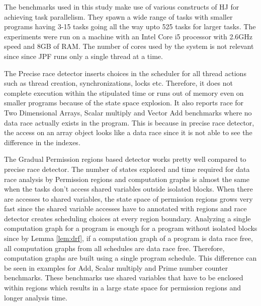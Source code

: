 The benchmarks used in this study make use of various constructs of HJ for achieving task parallelism. They spawn a wide range of tasks with smaller programs having 3-15 tasks going all the way upto 525 tasks for larger tasks. The experiments were run on a machine with an Intel Core i5 processor with 2.6GHz speed and 8GB of RAM. The number of cores used by the system is not relevant since since JPF runs only a single thread at a time.

The Precise race detector inserts choices in the scheduler for all thread actions such as thread creation, synchronizations, locks etc. Therefore, it does not complete execution within the stipulated time or runs out of memory even on smaller programs because of the state space explosion. It also reports race for Two Dimensional Arrays, Scalar multiply and Vector Add benchmarks where no data race actually exists in the program. This is because in precise race detector, the access on an array object looks like a data race since it is not able to see the difference in the indexes.

The Gradual Permission regions based detector works pretty well compared to precise race detector. The number of states explored and time required for data race analysis by Permission regions and computation graphs is almost the same when the tasks don't access shared variables outside isolated blocks. When there are accesses to shared variables, the state space of permission regions grows very fast since the shared variable accesses have to annotated with regions and race detector creates scheduling choices at every region boundary. Analyzing a single computation graph for a program is enough for a program without isolated blocks since by Lemma \ref{lem:drf}, if a computation graph of a program is data race free, all computation graphs from all schedules are data race free. Therefore, computation graphs are built using a single program schedule. This difference can be seen in examples for Add, Scalar multiply and Prime number counter benchmarks. These benchmarks use shared variables that have to be enclosed within regions which results in a large state space for permission regions and longer analysis time.

